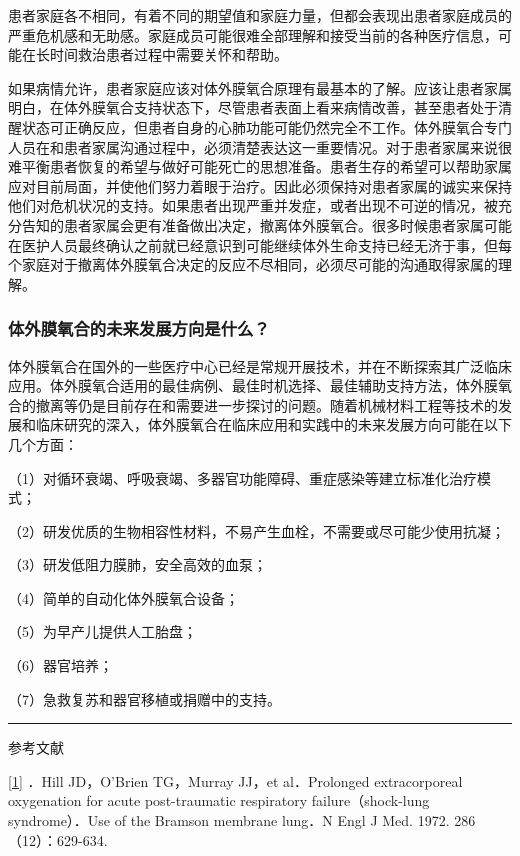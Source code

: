 患者家庭各不相同，有着不同的期望值和家庭力量，但都会表现出患者家庭成员的严重危机感和无助感。家庭成员可能很难全部理解和接受当前的各种医疗信息，可能在长时间救治患者过程中需要关怀和帮助。

如果病情允许，患者家庭应该对体外膜氧合原理有最基本的了解。应该让患者家属明白，在体外膜氧合支持状态下，尽管患者表面上看来病情改善，甚至患者处于清醒状态可正确反应，但患者自身的心肺功能可能仍然完全不工作。体外膜氧合专门人员在和患者家属沟通过程中，必须清楚表达这一重要情况。对于患者家属来说很难平衡患者恢复的希望与做好可能死亡的思想准备。患者生存的希望可以帮助家属应对目前局面，并使他们努力着眼于治疗。因此必须保持对患者家属的诚实来保持他们对危机状况的支持。如果患者出现严重并发症，或者出现不可逆的情况，被充分告知的患者家属会更有准备做出决定，撤离体外膜氧合。很多时候患者家属可能在医护人员最终确认之前就已经意识到可能继续体外生命支持已经无济于事，但每个家庭对于撤离体外膜氧合决定的反应不尽相同，必须尽可能的沟通取得家属的理解。

\subsubsection{体外膜氧合的未来发展方向是什么？}

体外膜氧合在国外的一些医疗中心已经是常规开展技术，并在不断探索其广泛临床应用。体外膜氧合适用的最佳病例、最佳时机选择、最佳辅助支持方法，体外膜氧合的撤离等仍是目前存在和需要进一步探讨的问题。随着机械材料工程等技术的发展和临床研究的深入，体外膜氧合在临床应用和实践中的未来发展方向可能在以下几个方面：

（1）对循环衰竭、呼吸衰竭、多器官功能障碍、重症感染等建立标准化治疗模式；

（2）研发优质的生物相容性材料，不易产生血栓，不需要或尽可能少使用抗凝；

（3）研发低阻力膜肺，安全高效的血泵；

（4）简单的自动化体外膜氧合设备；

（5）为早产儿提供人工胎盘；

（6）器官培养；

（7）急救复苏和器官移植或捐赠中的支持。

\begin{center}\rule{0.5\linewidth}{\linethickness}\end{center}

参考文献

\protect\hyperlink{text00030.htmlux5cux23ch1-29-back}{{[}1{]}} ．Hill
JD，O'Brien TG，Murray JJ，et al．Prolonged extracorporeal oxygenation
for acute post-traumatic respiratory failure（shock-lung syndrome）．Use
of the Bramson membrane lung．N Engl J Med. 1972. 286（12）：629-634.

